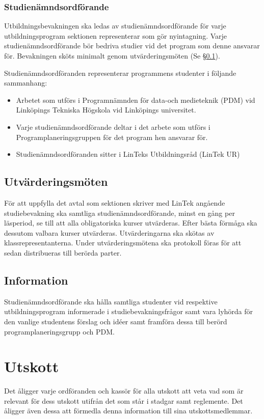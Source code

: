 \documentclass{datateknologsektionen-document}
\begin{document}
\subsubsection{Studienämndsordförande}
\label{snordf}
Utbildningsbevakningen ska ledas av studienämndsordförande för varje utbildningsprogram
sektionen representerar som gör nyintagning. Varje studienämndsordförande bör bedriva
studier vid det program som denne ansvarar för. Bevakningen sköts minimalt genom
utvärderingsmöten (Se \S \ref{utvarderingsmoten}).

Studienämndsordföranden representerar programmens studenter i följande sammanhang:
\begin{itemize}
  \item Arbetet som utförs i Programnämnden för data-och medieteknik (PDM) vid Linköpings Tekniska Högskola vid Linköpings universitet.
  \item Varje studienämndsordförande deltar i det arbete som utförs i Programplaneringsgruppen för det program hen ansvarar för.
  \item Studienämndsordföranden sitter i LinTeks Utbildningsråd (LinTek UR)
\end{itemize}
\subsection{Utvärderingsmöten}
\label{utvarderingsmoten}
För att uppfylla det avtal som sektionen skriver med LinTek angående studiebevakning ska
samtliga studienämndsordförande, minst en gång per läsperiod, se till att alla obligatoriska kurser
utvärderas. Efter bästa förmåga ska dessutom valbara kurser utvärderas. Utvärderingarna ska
skötas av klassrepresentanterna. Under utvärderingsmötena ska protokoll föras för att sedan
distribueras till berörda parter.
\subsection{Information}
Studienämndsordförande ska hålla samtliga studenter vid respektive utbildningsprogram
informerade i studiebevakningsfrågor samt vara lyhörda för den vanlige studentens förslag och
idéer samt framföra dessa till berörd programplaneringsgrupp och PDM.
\section{Utskott}
Det åligger varje ordföranden och kassör för alla utskott att veta vad som är relevant för dess
utskott utifrån det som står i stadgar samt reglemente. Det åligger även dessa att förmedla denna
information till sina utskottsmedlemmar.
\end{document}
